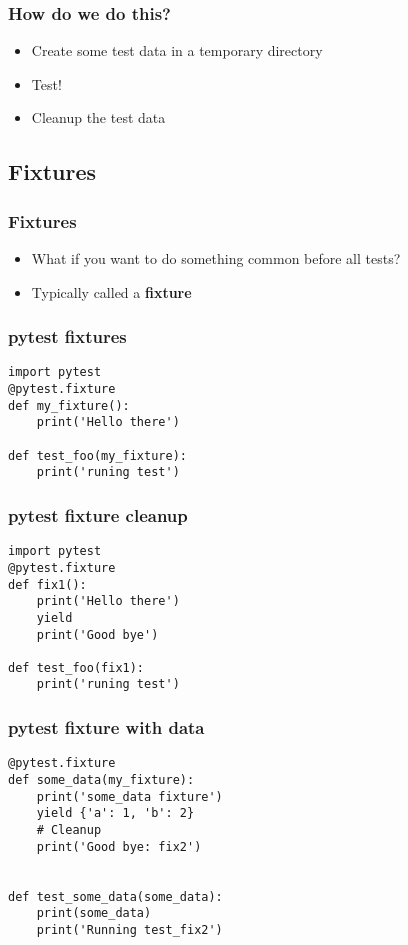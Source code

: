 \documentclass[14pt,compress]{beamer}
\begin{document}
\begin{frame}
  \frametitle{How do we do this?}
  \begin{itemize}
  \item Create some test data in a temporary directory
  \item Test!
  \item Cleanup the test data
  \end{itemize}
\end{frame}


\subsection{Fixtures}

\begin{frame}
  \frametitle{Fixtures}
  \begin{itemize}
  \item What if you want to do something common before all tests?
  \item Typically called a \textbf{fixture}
  \end{itemize}
\end{frame}

\begin{frame}[fragile]
  \frametitle{pytest fixtures}
  \begin{lstlisting}
import pytest
@pytest.fixture
def my_fixture():
    print('Hello there')

def test_foo(my_fixture):
    print('runing test')

  \end{lstlisting}
\end{frame}

\begin{frame}[fragile]
  \frametitle{pytest fixture cleanup}
  \begin{lstlisting}
import pytest
@pytest.fixture
def fix1():
    print('Hello there')
    yield
    print('Good bye')

def test_foo(fix1):
    print('runing test')

  \end{lstlisting}
\end{frame}

\begin{frame}[fragile]
  \frametitle{pytest fixture with data}
  \begin{lstlisting}
@pytest.fixture
def some_data(my_fixture):
    print('some_data fixture')
    yield {'a': 1, 'b': 2}
    # Cleanup
    print('Good bye: fix2')


def test_some_data(some_data):
    print(some_data)
    print('Running test_fix2')
  \end{lstlisting}
\end{frame}
\end{document}
